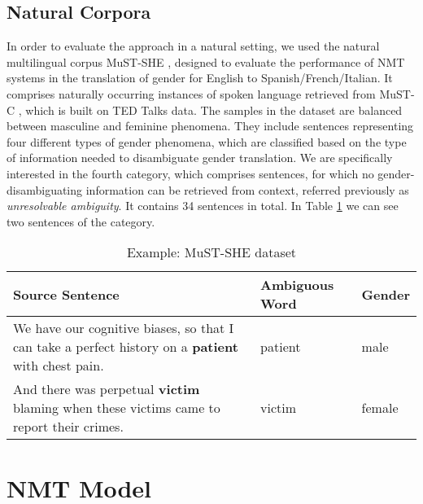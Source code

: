 \subsection{Natural Corpora}
\label{sec:Setup:Natural_Corpora}

In order to evaluate the approach in a natural setting, we used the natural multilingual corpus MuST-SHE \parencite{MuST-SHE}, designed to evaluate the performance of NMT systems in the translation of gender for English to Spanish/French/Italian. It comprises naturally occurring instances of spoken language retrieved from MuST-C \parencite{MuST-C}, which is built on TED Talks data. The samples in the dataset are balanced between masculine and feminine phenomena. They include sentences representing four different types of gender phenomena, which are classified based
on the type of information needed to disambiguate gender translation. We are specifically interested in the fourth category, which comprises sentences, for which no gender-disambiguating information can be retrieved from context, referred previously as \textit{unresolvable ambiguity}. It contains 34 sentences in total. In Table \ref{tab:mustshe} we can see two sentences of the category. 

\begin{table} 
    \begin{tabularx}{\linewidth}{|X|l|l|}
        \hline
        \textbf{Source Sentence} & \textbf{Ambiguous Word} & \textbf{Gender} \\ \hline
        We have our cognitive biases, so that I can take a perfect history on a \textbf{patient} with chest pain. & patient & male \\ \hline
        And there was perpetual \textbf{victim} blaming when these victims came to report their crimes. & victim & female \\ \hline
    \end{tabularx}
    \caption{Example: MuST-SHE dataset}
    \label{tab:mustshe}
\end{table}

\section{NMT Model}
\label{sec:Setup:Models}



